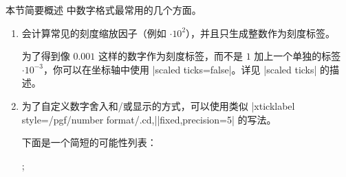 本节简要概述 \PGFPlots{} 中数字格式最常用的几个方面。
%
\begin{enumerate}
    \item \PGFPlots{} 会计算常见的刻度缩放因子（例如 $\cdot 10^2$），并且只生成整数作为刻度标签。

        为了得到像 $0.001$ 这样的数字作为刻度标签，而不是 $1$ 加上一个单独的标签 $\cdot 10^{-3}$，你可以在坐标轴中使用 |scaled ticks=false|。详见 |scaled ticks| 的描述。
    \item 为了自定义数字舍入和/或显示的方式，可以使用类似
        |xticklabel style={/pgf/number format/.cd,|\allowbreak|fixed,precision=5}| 的写法。

        下面是一个简短的可能性列表：
\begin{codeexample}[]
\end{codeexample}

\begin{codeexample}[]
\end{codeexample}

\begin{codeexample}[]
\end{codeexample}

\begin{codeexample}[]
\end{codeexample}

\begin{codeexample}[]
\end{codeexample}

\begin{codeexample}[]
\end{codeexample}

\begin{codeexample}[]
\end{codeexample}

\begin{codeexample}[]
\end{codeexample}

\begin{codeexample}[]
;
\end{codeexample}


\end{enumerate}
